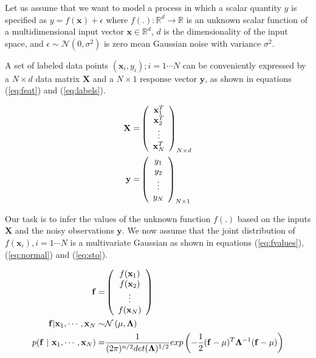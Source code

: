 Let us assume that we want to model a process in which a scalar quantity $y$ is specified as $y = f(\mathbf{x}) + \epsilon$ where   $f(.): \mathbb{R}^d \rightarrow \mathbb{R}$ is an unknown scalar function of a multidimensional input vector $\mathbf{x} \in \mathbb{R}^d$, $d$ is the dimensionality of the input space, and $\epsilon \sim \mathcal{N}(0, \sigma^2)$ is zero mean Gaussian noise with variance $\sigma^2$.

A set of labeled data points ${(\mathbf{x}_i, y_i); i = 1 \cdots N}$ can be conveniently expressed by a $N \times d$ data matrix $\mathbf{X}$ and a $N \times 1$ response vector $\mathbf{y}$, as shown in equations (\ref{eq:feat}) and (\ref{eq:labels}).

\begin{align}
  \mathbf{X}  = & \left( \begin{array}{c} \mathbf{x}^{T}_1 \\ \mathbf{x}^{T}_2 \\ \vdots \\ \mathbf{x}^{T}_N \end{array} \right)_{N \times d} \label{eq:feat} \\
  \vspace{2\baselineskip}
  \mathbf{y}  = & \left( \begin{array}{c} y_1 \\ y_2 \\ \vdots \\ y_N \end{array} \right) _{N \times 1} \label{eq:labels}
\end{align}

Our task is to infer the values of the unknown function $f(.)$ based on the inputs $\mathbf{X}$ and the noisy observations $\mathbf{y}$. We now assume that the joint distribution of $f(\mathbf{x}_i), i = 1 \cdots N$ is a multivariate Gaussian as shown in equations (\ref{eq:fvalues}), (\ref{eq:normal}) and (\ref{eq:sto}).

\begin{align}
 \mathbf{f} = & \left( \begin{array}{c} f(\mathbf{x}_1) \\ f(\mathbf{x}_2) \\ \vdots \\ f(\mathbf{x}_N) \end{array} \right) \label{eq:fvalues}\\
 \vspace{2\baselineskip}
 \mathbf{f} | \mathbf{x}_1, \cdots, \mathbf{x}_N \sim & \mathcal{N}\left( \mathbf{\mu}, \mathbf{\Lambda} \right)  \label{eq:normal}\\
 \vspace{2\baselineskip}
 p( \mathbf{f} \ | \ \mathbf{x}_1, \cdots, \mathbf{x}_N) = & \frac{1}{(2\pi)^{n/2} det(\mathbf{\Lambda})^{1/2}} exp \left(-\frac{1}{2} (\mathbf{f} - \mathbf{\mu})^T \mathbf{\Lambda}^{-1} (\mathbf{f} - \mathbf{\mu}) \right) \label{eq:sto}
\end{align}

